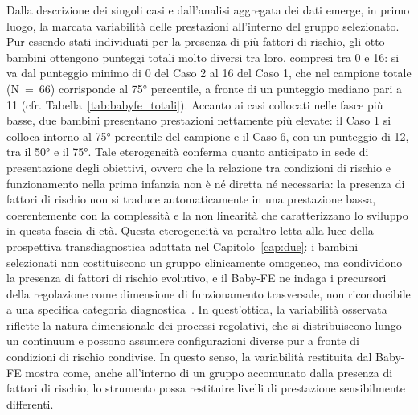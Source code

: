 Dalla descrizione dei singoli casi e dall'analisi aggregata dei dati emerge, in primo luogo, la marcata variabilità delle prestazioni all'interno del gruppo selezionato. Pur essendo stati individuati per la presenza di più fattori di rischio, gli otto bambini ottengono punteggi totali molto diversi tra loro, compresi tra 0 e 16: si va dal punteggio minimo di 0 del Caso 2 al 16 del Caso 1, che nel campione totale (N~=~66) corrisponde al 75° percentile, a fronte di un punteggio mediano pari a 11 (cfr. Tabella~\ref{tab:babyfe_totali}). Accanto ai casi collocati nelle fasce più basse, due bambini presentano prestazioni nettamente più elevate: il Caso 1 si colloca intorno al 75° percentile del campione e il Caso 6, con un punteggio di 12, tra il 50° e il 75°. Tale eterogeneità conferma quanto anticipato in sede di presentazione degli obiettivi, ovvero che la relazione tra condizioni di rischio e funzionamento nella prima infanzia non è né diretta né necessaria: la presenza di fattori di rischio non si traduce automaticamente in una prestazione bassa, coerentemente con la complessità e la non linearità che caratterizzano lo sviluppo in questa fascia di età. Questa eterogeneità va peraltro letta alla luce della prospettiva transdiagnostica adottata nel Capitolo~\ref{cap:due}: i bambini selezionati non costituiscono un gruppo clinicamente omogeneo, ma condividono la presenza di fattori di rischio evolutivo, e il Baby-FE ne indaga i precursori della regolazione come dimensione di funzionamento trasversale, non riconducibile a una specifica categoria diagnostica~\cite{beauchaine2019,astle2022}. In quest'ottica, la variabilità osservata riflette la natura dimensionale dei processi regolativi, che si distribuiscono lungo un continuum e possono assumere configurazioni diverse pur a fronte di condizioni di rischio condivise. In questo senso, la variabilità restituita dal Baby-FE mostra come, anche all'interno di un gruppo accomunato dalla presenza di fattori di rischio, lo strumento possa restituire livelli di prestazione sensibilmente differenti.

